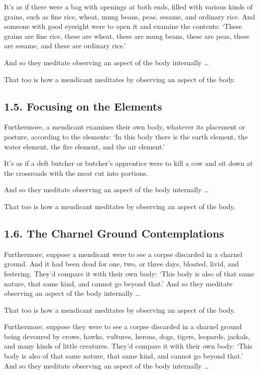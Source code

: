 \documentclass[12pt,openany]{book}%
\begin{document}
It’s as if there were a bag with openings at both ends, filled with various kinds of grains, such as fine rice, wheat, mung beans, peas, sesame, and ordinary rice. And someone with good eyesight were to open it and examine the contents: ‘These grains are fine rice, these are wheat, these are mung beans, these are peas, these are sesame, and these are ordinary rice.’ 

And so they meditate observing an aspect of the body internally … 

That too is how a mendicant meditates by observing an aspect of the body. 

\subsection*{1.5. Focusing on the Elements }

Furthermore, a mendicant examines their own body, whatever its placement or posture, according to the elements: ‘In this body there is the earth element, the water element, the fire element, and the air element.’ 

It’s as if a deft butcher or butcher’s apprentice were to kill a cow and sit down at the crossroads with the meat cut into portions. 

And so they meditate observing an aspect of the body internally … 

That too is how a mendicant meditates by observing an aspect of the body. 

\subsection*{1.6. The Charnel Ground Contemplations }

Furthermore, suppose a mendicant were to see a corpse discarded in a charnel ground. And it had been dead for one, two, or three days, bloated, livid, and festering. They’d compare it with their own body: ‘This body is also of that same nature, that same kind, and cannot go beyond that.’ And so they meditate observing an aspect of the body internally … 

That too is how a mendicant meditates by observing an aspect of the body. 

Furthermore, suppose they were to see a corpse discarded in a charnel ground being devoured by crows, hawks, vultures, herons, dogs, tigers, leopards, jackals, and many kinds of little creatures. They’d compare it with their own body: ‘This body is also of that same nature, that same kind, and cannot go beyond that.’ And so they meditate observing an aspect of the body internally … 
\end{document}
